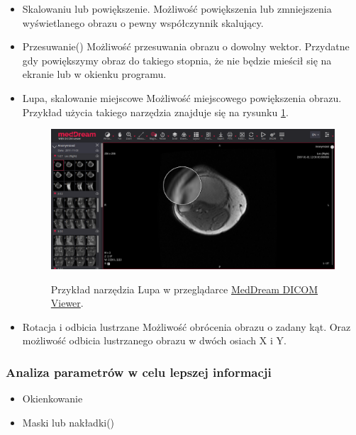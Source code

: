 \begin{itemize}
    \item Skalowaniu lub powiększenie.
          Możliwość powiększenia lub zmniejszenia wyświetlanego obrazu o pewny współczynnik skalujący.

    \item Przesuwanie()
          Możliwość przesuwania obrazu o dowolny wektor.
          Przydatne gdy powiększymy obraz do takiego stopnia, że nie będzie mieścił się na ekranie lub w okienku programu.

    \item Lupa, skalowanie miejscowe
          Możliwość miejscowego powiększenia obrazu.
          Przykład użycia takiego narzędzia znajduje się na rysunku \ref{fig:wyswietlanie001}.

          \begin{figure}[!htbp]
              \caption{Przykład narzędzia Lupa w przeglądarce \href{https://www.softneta.com/products/meddream-dicom-viewer/}{MedDream DICOM Viewer}.}
              \includegraphics[width=\textwidth]{img/wyswietlanie001.png}
              \centering
              \label{fig:wyswietlanie001}
          \end{figure}

    \item Rotacja i odbicia lustrzane
          Możliwość obrócenia obrazu o zadany kąt.
          Oraz możliwość odbicia lustrzanego obrazu w dwóch osiach X i Y.

\end{itemize}

\subsubsection{Analiza parametrów w celu lepszej informacji}

\begin{itemize}
    \item Okienkowanie
    \item Maski lub nakładki()
\end{itemize}

